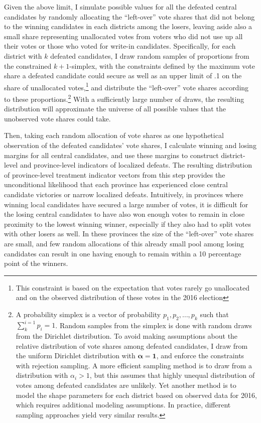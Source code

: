 \documentclass[12pt]{article}
\newcommand\fnote[1]{\footnote{\baselineskip=2\normalbaselineskip#1}}
\newcommand{\1}{\mathbbm{1}}
\begin{document}
Given the above limit, I simulate possible values for all the defeated central candidates by randomly allocating the ``left-over'' vote shares that did not belong to the winning candidates in each districts among the losers, leaving aside also a small share representing unallocated votes from voters who did not use up all their votes or those who voted for write-in candidates. Specifically, for each district with $k$ defeated candidates, I draw random samples of proportions from the constrained $k+1$-simplex, with the constraints defined by the maximum vote share a defeated candidate could secure as well as an upper limit of .1 on the share of unallocated votes,\fnote{This constraint is based on the expectation that votes rarely go unallocated and on the observed distribution of these votes in the 2016 election} and distribute the ``left-over'' vote shares according to these proportions.\fnote{A probability simplex is a vector of probability $p_1, p_2, \dots, p_k$ such that $\sum_{k}^{i=1}p_i = 1$. Random samples from the simplex is done with random draws from the Dirichlet distribution. To avoid making assumptions about the relative distribution of vote shares among defeated candidates, I draw from the uniform Dirichlet distribution with $\mathbf{\alpha} = \mathbf{1}$, and enforce the constraints with rejection sampling. A more efficient sampling method is to draw from a distribution with $\alpha_i > 1$, but this assumes that highly unequal distribution of votes among defeated candidates are unlikely. Yet another method is to model the shape parameters for each district based on observed data for 2016, which requires additional modeling assumptions. In practice, different sampling approaches yield very similar results.} With a sufficiently large number of draws, the resulting distribution will approximate the universe of all possible values that the unobserved vote shares could take.

Then, taking each random allocation of vote shares as one hypothetical observation of the defeated candidates' vote shares, I calculate winning and losing margins for all central candidates, and use these margins to construct district-level and province-level indicators of localized defeats. The resulting distribution of province-level treatment indicator vectors from this step provides the unconditional likelihood that each province has experienced close central candidate victories or narrow localized defeats. Intuitively, in provinces where winning local candidates have secured a large number of votes, it is difficult for the losing central candidates to have also won enough votes to remain in close proximity to the lowest winning winner, especially if they also had to split votes with other losers as well. In these provinces the size of the ``left-over'' vote shares are small, and few random allocations of this already small pool among losing candidates can result in one having enough to remain within a 10 percentage point of the winners.
\end{document}
